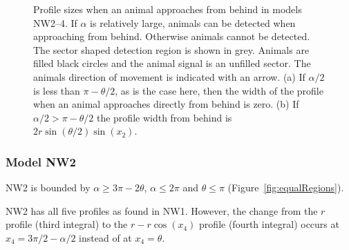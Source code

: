 \begin{figure}[t]
  \centering
{
}
\caption[Profile sizes when an animal approaches from behind in models NW2--4]{
Profile sizes when an animal approaches from behind in models NW2--4.
If $\alpha$ is relatively large, animals can be detected when approaching from behind.
Otherwise animals cannot be detected.
The sector shaped detection region is shown in grey.
Animals are filled black circles and the animal signal is an unfilled sector.
The animals direction of movement is indicated with an arrow.
(a) If $\alpha/2$ is less than $\pi - \theta/2$, as is the case here, then the width of the profile when an animal approaches directly from behind is zero.
(b) If $\alpha/2 > \pi - \theta/2$ the profile width from behind is $2r\sin\left(\theta/2\right)\sin(x_2)$.
}
\label{fig:NW2--4}
\end{figure}


\subsubsection{Model NW2} \label{NW2}

NW2 is bounded by $\alpha \ge 3\pi - 2\theta$, $\alpha \le 2\pi$ and $\theta\le\pi$ (Figure~\ref{fig:equalRegions}).

NW2 has all five profiles as found in NW1.
However, the change from the $r$ profile (third integral) to the $r - r\cos(x_4)$ profile (fourth integral) occurs at $x_4 = 3\pi/2 - \alpha/2$ instead of at $x_4 = \theta$.




